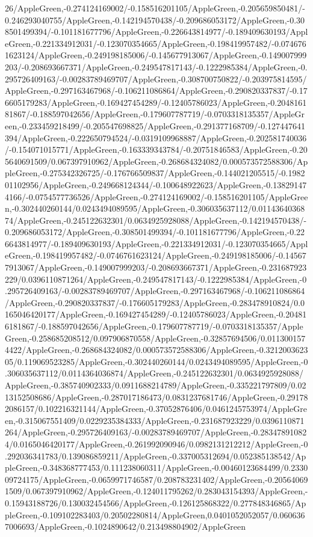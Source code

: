 {\begin{tikzternal}
{26/AppleGreen,-0.274124169002/-0.158516201105/AppleGreen,-0.205659850481/-0.246293040755/AppleGreen,-0.142194570438/-0.209686053172/AppleGreen,-0.308501499394/-0.101181677796/AppleGreen,-0.226643814977/-0.189409630193/AppleGreen,-0.221334912031/-0.123070354665/AppleGreen,-0.198419957482/-0.0746761623124/AppleGreen,-0.249198185006/-0.145677913067/AppleGreen,-0.149007999203/-0.208693667371/AppleGreen,-0.249547817143/-0.1222985384/AppleGreen,-0.295726409163/-0.00283789469707/AppleGreen,-0.308700750822/-0.203975814595/AppleGreen,-0.297163467968/-0.106211086864/AppleGreen,-0.290820337837/-0.176605179283/AppleGreen,-0.169427454289/-0.12405786023/AppleGreen,-0.204816181867/-0.188597042656/AppleGreen,-0.179607787719/-0.0703318135357/AppleGreen,-0.233459218499/-0.205547698825/AppleGreen,-0.291377168709/-0.127447641394/AppleGreen,-0.222650794524/-0.0319109968887/AppleGreen,-0.202581740036/-0.154071015771/AppleGreen,-0.163339343784/-0.20751846583/AppleGreen,-0.205640691509/0.067397910962/AppleGreen,-0.268684324082/0.000573572588306/AppleGreen,-0.275342326725/-0.176766509837/AppleGreen,-0.144021205515/-0.198201102956/AppleGreen,-0.249668124344/-0.100648922623/AppleGreen,-0.138291474166/-0.0754577736526/AppleGreen,-0.274124169002/-0.158516201105/AppleGreen,-0.302440260144/0.0243494089595/AppleGreen,-0.306035637112/0.0114364036874/AppleGreen,-0.245122632301/0.0634925928088/AppleGreen,-0.142194570438/-0.209686053172/AppleGreen,-0.308501499394/-0.101181677796/AppleGreen,-0.226643814977/-0.189409630193/AppleGreen,-0.221334912031/-0.123070354665/AppleGreen,-0.198419957482/-0.0746761623124/AppleGreen,-0.249198185006/-0.145677913067/AppleGreen,-0.149007999203/-0.208693667371/AppleGreen,-0.231687923229/0.0396110871264/AppleGreen,-0.249547817143/-0.1222985384/AppleGreen,-0.295726409163/-0.00283789469707/AppleGreen,-0.297163467968/-0.106211086864/AppleGreen,-0.290820337837/-0.176605179283/AppleGreen,-0.283478910824/0.0165046420177/AppleGreen,-0.169427454289/-0.12405786023/AppleGreen,-0.204816181867/-0.188597042656/AppleGreen,-0.179607787719/-0.0703318135357/AppleGreen,-0.258685208512/0.097906870558/AppleGreen,-0.32857694506/0.0113001574422/AppleGreen,-0.268684324082/0.000573572588306/AppleGreen,-0.321200362305/0.119069523285/AppleGreen,-0.302440260144/0.0243494089595/AppleGreen,-0.306035637112/0.0114364036874/AppleGreen,-0.245122632301/0.0634925928088/AppleGreen,-0.385740902333/0.0911688214789/AppleGreen,-0.335221797809/0.0213152508686/AppleGreen,-0.287017186473/0.0831237681746/AppleGreen,-0.291782086157/0.102216321144/AppleGreen,-0.37052876406/0.0461245753974/AppleGreen,-0.315067551409/0.0229235384333/AppleGreen,-0.231687923229/0.0396110871264/AppleGreen,-0.295726409163/-0.00283789469707/AppleGreen,-0.283478910824/0.0165046420177/AppleGreen,-0.261992090946/0.0982131212212/AppleGreen,-0.292036341783/0.139086859211/AppleGreen,-0.337005312694/0.052385138542/AppleGreen,-0.348368777453/0.111238060311/AppleGreen,-0.00460123684499/0.233009724175/AppleGreen,-0.0659971746587/0.208783231402/AppleGreen,-0.205640691509/0.067397910962/AppleGreen,-0.124011795262/0.283043154393/AppleGreen,-0.15943188726/0.130032454566/AppleGreen,-0.126125868322/0.277848346865/AppleGreen,-0.109102283403/0.20502280814/AppleGreen,0.0401052052057/0.0606367006693/AppleGreen,-0.1024890642/0.213498804902/AppleGreen}
\end{tikzternal}}
